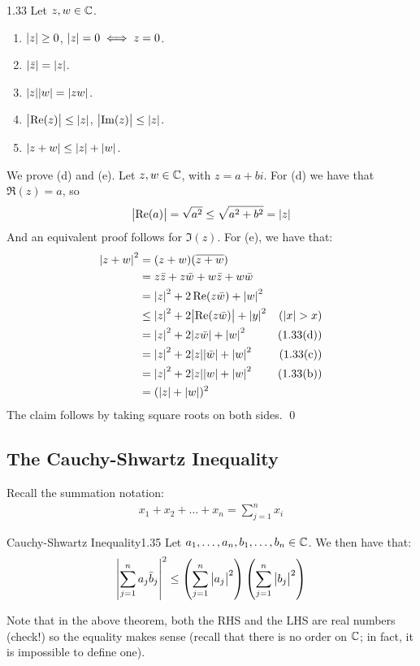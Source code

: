 \begin{theorem}{}{1.33}
    Let $z, w \in \mathbb{C}$.
    \begin{enumerate}
        \item $\abs{z} \geq 0$, $\abs{z} = 0 \iff z = 0$. 
        \item $\abs{\bar{z}} = \abs{z}$.
        \item $\abs{z}\abs{w} = \abs{zw}$.
        \item $\abs{\Re(z)} \leq \abs{z}$, $\abs{\Im(z)} \leq \abs{z}$.
        \item $\abs{z + w} \leq \abs{z} + \abs{w}$.
    \end{enumerate}
\end{theorem}
\begin{nproof}
    We prove (d) and (e). Let $z, w \in \mathbb{C}$, with $z = a + bi$. For (d) we have that $\Re(z) = a$, so \begin{align*}
        \abs{\Re(a)} = \sqrt{a^2} \leq \sqrt{a^2 + b^2} = \abs{z}
    \end{align*}
    And an equivalent proof follows for $\Im(z)$. For (e), we have that:
    \begin{align*}
        \abs{z + w}^2 &= (z + w)(\overline{z + w})
        \\ &= z\bar{z} + z\bar{w} + w\bar{z} + w\bar{w}
        \\ &= \abs{z}^2 + 2\Re(z\bar{w}) + \abs{w}^2
        \\ &\leq \abs{z}^2 + 2\abs{\Re(z\bar{w})} + \abs{y}^2 & \text{($\abs{x} > x$)}
        \\ &= \abs{z}^2 + 2\abs{z\bar{w}} + \abs{w}^2 & \text{(1.33(d))}
        \\ &= \abs{z}^2 + 2\abs{z}\abs{\bar{w}} + \abs{w}^2 & \text{(1.33(c))}
        \\ &= \abs{z}^2 + 2\abs{z}\abs{w} + \abs{w}^2 & \text{(1.33(b))}
        \\ &= (\abs{z} + \abs{w})^2
    \end{align*}
The claim follows by taking square roots on both sides. \qed
\end{nproof}



\subsection{The Cauchy-Shwartz Inequality}
Recall the summation notation:
\begin{align*}
    x_1 + x_2 + \ldots + x_n = \sum_{j=1}^{n}x_i
\end{align*}
\begin{theorem}{Cauchy-Shwartz Inequality}{1.35}
    Let $a_1, \ldots, a_n, b_1, \ldots, b_n \in \mathbb{C}$. We then have that:
    \begin{align*}
        \abs{\sum_{j=1}^na_j\bar{b}_j}^2 \leq \left(\sum_{j=1}^n\abs{a_j}^2\right)\left(\sum_{j=1}^n\abs{b_j}^2\right)
    \end{align*}
\end{theorem}
\noindent Note that in the above theorem, both the RHS and the LHS are real numbers (check!) so the equality makes sense (recall that there is no order on $\mathbb{C}$; in fact, it is impossible to define one). 

